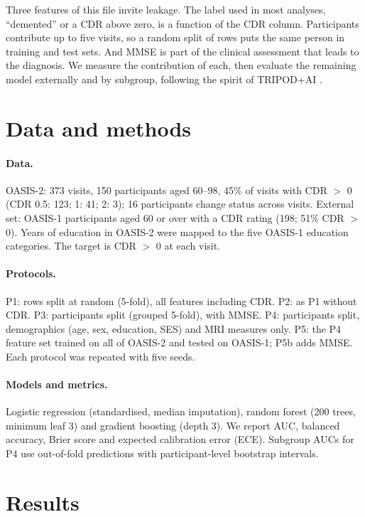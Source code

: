 \documentclass[11pt]{article}
\begin{document}
Three features of this file invite leakage. The label used in most analyses, ``demented'' or a CDR above zero, is a function of the CDR
column. Participants contribute up to five visits, so a random split of rows puts the same person in training and test sets. And MMSE
is part of the clinical assessment that leads to the diagnosis. We measure the contribution of each, then evaluate the remaining
model externally and by subgroup, following the spirit of TRIPOD+AI \cite{collins2024tripodai}.

\section{Data and methods}
\paragraph{Data.} OASIS-2: 373 visits, 150 participants aged 60--98, 45\% of visits with CDR \(>\) 0 (CDR 0.5: 123; 1: 41; 2: 3); 16
participants change status across visits. External set: OASIS-1 participants aged 60 or over with a CDR rating (198; 51\% CDR \(>\)
0). Years of education in OASIS-2 were mapped to the five OASIS-1 education categories. The target is CDR \(>\) 0 at each visit.

\paragraph{Protocols.} P1: rows split at random (5-fold), all features including CDR. P2: as P1 without CDR. P3: participants split
(grouped 5-fold), with MMSE. P4: participants split, demographics (age, sex, education, SES) and MRI measures only. P5: the P4 feature
set trained on all of OASIS-2 and tested on OASIS-1; P5b adds MMSE. Each protocol was repeated with five seeds.

\paragraph{Models and metrics.} Logistic regression (standardised, median imputation), random forest (200 trees, minimum leaf 3) and
gradient boosting (depth 3). We report AUC, balanced accuracy, Brier score and expected calibration error (ECE). Subgroup AUCs for P4
use out-of-fold predictions with participant-level bootstrap intervals.

\section{Results}

\end{document}
